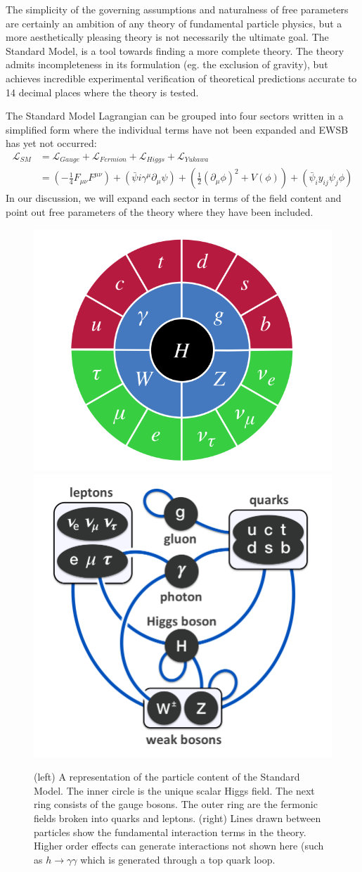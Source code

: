 The simplicity of the governing assumptions and naturalness of free parameters are certainly 
an ambition of any theory of fundamental particle physics, but a more aesthetically 
pleasing theory is not necessarily the ultimate goal. The Standard
Model, is a tool towards finding a more complete theory. The theory admits 
incompleteness in its formulation (eg. the exclusion of gravity), but achieves
incredible experimental verification \cite{gminus2} of theoretical predictions \cite{loop8qed} accurate to 14 decimal places where
the theory is tested. 

The Standard Model Lagrangian can be grouped into four sectors written in a simplified form where the individual terms have not been 
expanded and EWSB has yet not occurred: 
\begin{align*}
\mathcal{L}_{SM} &= \mathcal{L}_{Gauge} + \mathcal{L}_{Fermion} + \mathcal{L}_{Higgs} + \mathcal{L}_{Yukawa}\\
&=\left(-\frac{1}{4} F_{\mu\nu}F^{\mu\nu} \right )
  + \left (\bar\psi i\gamma^\mu \partial_\mu \psi \right) +
 \left(\frac{1}{2}(\partial_\mu \phi)^2 + V(\phi) \right) + \left(\bar \psi_i y_{ij} \psi_j \phi \right ) 
\end{align*}
In our discussion, we will expand each sector in terms of the field content and point out free parameters of the
theory where they have been included. 
\begin{figure}
\begin{center}
\includegraphics[width=.45\textwidth]{pics/sm_model_particles}
\includegraphics[width=.45\textwidth]{pics/principal_interactions}
\caption{ (left) A representation of the particle content of the Standard Model. 
The inner circle is the unique scalar Higgs field. The next ring consists of the 
gauge bosons. The outer ring are the fermonic fields broken into quarks and leptons. (right) Lines drawn between particles show the fundamental interaction terms in the theory. Higher order effects can generate interactions not shown here (such as $h\rightarrow \gamma\gamma$ which is generated through a top quark loop.}
\end{center}
\end{figure}

